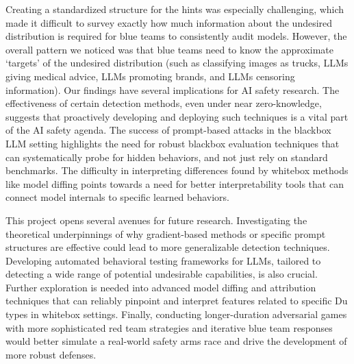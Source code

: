 \documentclass[letterpaper]{article} %
\begin{document}
Creating a standardized structure for the hints was especially challenging, which made it difficult to survey exactly how much information about the undesired distribution is required for blue teams to consistently audit models. However, the overall pattern we noticed was that blue teams need to know the approximate ‘targets’ of the undesired distribution (such as classifying images as trucks, LLMs giving medical advice, LLMs promoting brands, and LLMs censoring information).
Our findings have several implications for AI safety research. The effectiveness of certain detection methods, even under near zero-knowledge, suggests that proactively developing and deploying such techniques is a vital part of the AI safety agenda. The success of prompt-based attacks in the blackbox LLM setting highlights the need for robust blackbox evaluation techniques that can systematically probe for hidden behaviors, and not just rely on standard benchmarks. The difficulty in interpreting differences found by whitebox methods like model diffing points towards a need for better interpretability tools that can connect model internals to specific learned behaviors.

This project opens several avenues for future research. Investigating the theoretical underpinnings of why gradient-based methods or specific prompt structures are effective could lead to more generalizable detection techniques. Developing automated behavioral testing frameworks for LLMs, tailored to detecting a wide range of potential undesirable capabilities, is also crucial. Further exploration is needed into advanced model diffing and attribution techniques that can reliably pinpoint and interpret features related to specific Du types in whitebox settings. Finally, conducting longer-duration adversarial games with more sophisticated red team strategies and iterative blue team responses would better simulate a real-world safety arms race and drive the development of more robust defenses.
\end{document}
